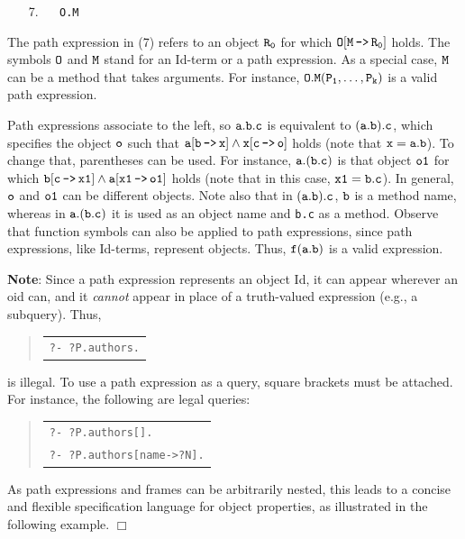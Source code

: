 \documentclass[11pt]{article}
\newenvironment{qrules}{\begin{quote}\tt\begin{tabular}[t]{l}}%
{\end{tabular}\end{quote}}
\newcommand{\mvd}{{\mbox{\tt \,->\,}}}  %
\begin{document}
  \medskip

\begin{enumerate} 
\item[7.]\label{eq-path-fun} ~~ {\tt O.M}
\end{enumerate} \medskip

\noindent
The path expression in (7) refers to an object $\tt R_0$ for which $\tt
O[M\mvd R_0]$ holds.  The symbols $\tt O$ and $\tt M$ stand for an Id-term
or a path expression.  As a special case, $\tt M$ can be a method that
takes arguments. For instance, $\tt O.M(P_1,\dots,P_k)$ is a valid path
expression.
  
Path expressions
associate to the left, so $\tt a.b.c$ is equivalent to $\tt (a.b).c$, which
specifies the object $\tt o$ such that $\tt a[b\mvd x] \land x[c\mvd o]$
holds (note that $\tt x=a.b$).
To change that, parentheses can be used. For instance, 
$\tt a.(b.c)$ is that object
$\tt o1$ for which $\tt b[c\mvd x1] \land a[x1\mvd o1]$ holds (note that in this
case, $\tt x1=b.c$). In general, $\tt o$ and $\tt o1$ can be different objects.
Note also that in $\tt (a.b).c$, $\tt b$ is a method name, whereas in $\tt
a.(b.c)$ it is used as an object name and {\tt b.c} as a method.  Observe
that function symbols can also be applied to path expressions, since path
expressions, like Id-terms, represent objects. Thus, $\tt f(a.b)$
is a valid expression.

\noindent
{\bf Note}: Since a path expression represents an object Id,
it can appear wherever an oid can, and it \emph{cannot} appear in
place of a truth-valued expression (e.g., a subquery).
Thus,
\begin{qrules}
\tt ?- ?P.authors.
\end{qrules}
is illegal. To use a path expression as a
query, square brackets must be attached. For instance, the following are
legal queries:
\begin{qrules}
   \tt ?- ?P.authors[]. \\
   \tt ?- ?P.authors[name->?N].
\end{qrules}
\noindent
As path expressions and frames can be arbitrarily nested, this leads
to a concise and flexible specification language for object properties, as
illustrated in the following example.
   \hfill$\Box$
\end{document}

